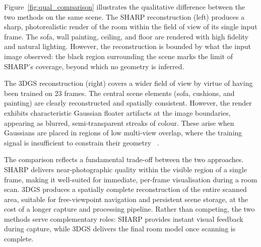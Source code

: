 Figure~\ref{fig:qual_comparison} illustrates the qualitative difference 
between the two methods on the same scene. The SHARP reconstruction 
(left) produces a sharp, photorealistic render of the room within the 
field of view of its single input frame. The sofa, wall painting, 
ceiling, and floor are rendered with high fidelity and natural 
lighting. However, the reconstruction is bounded by what the input 
image observed: the black region surrounding the scene marks the 
limit of SHARP's coverage, beyond which no geometry is inferred.

The 3DGS reconstruction (right) covers a wider field of view by 
virtue of having been trained on 23 frames. The central scene 
elements (sofa, cushions, and painting) are clearly 
reconstructed and spatially consistent. However, the render exhibits 
characteristic Gaussian floater artifacts at the image boundaries, 
appearing as blurred, semi-transparent streaks of colour. These 
arise when Gaussians are placed in regions of low multi-view 
overlap, where the training signal is insufficient to constrain 
their geometry ~\cite{kerbl20233dgs}.

The comparison reflects a fundamental trade-off between the two 
approaches. SHARP delivers near-photographic quality within the 
visible region of a single frame, making it well-suited for 
immediate, per-frame visualisation during a room scan. 3DGS 
produces a spatially complete reconstruction of the entire scanned 
area, suitable for free-viewpoint navigation and persistent scene 
storage, at the cost of a longer capture and processing pipeline. 
Rather than competing, the two methods serve complementary roles: 
SHARP provides instant visual feedback during capture, while 3DGS 
delivers the final room model once scanning is complete.


